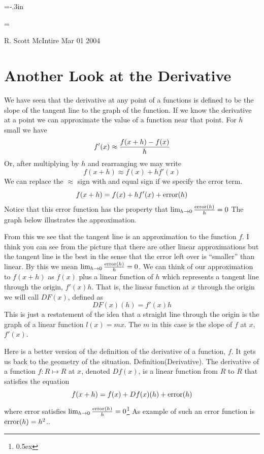 


\vsize=9.5in
\voffset=-.3in


\parindent=0pt
\parskip=\baselineskip

{R. Scott McIntire} {Mar 01 2004}

\section{Another Look at the Derivative}
We have seen that the derivative at any point of a functions is defined 
to be the slope of the 
tangent line to the graph of the function. If we know the derivative at 
a point we can approximate the value of a function near that point.
For $h$ small we have
$$
f'(x) \approx {f(x+h) - f(x) \over h }
$$
Or, after multiplying by $h$ and rearranging we may write
$$
f(x+h) \approx f(x) + h f'(x)
$$
We can replace the $\approx$ sign with and equal sign if we specify 
the error term. 
$$
f(x+h) = f(x) + h f'(x) + {\rm error\/}(h)
$$
Notice that this error function has the property that 
$\lim_{h \rightarrow 0} {{\rm error\/}(h) \over h } = 0$ 
The graph below illustrates the approximation. 

From this we see that the tangent line is an approximation to the function $f$.
I think you can see from the picture that there are other linear approximations 
but the tangent line is the best in the sense that the error left over is 
``smaller'' than linear. By this we mean 
$\lim_{h \rightarrow 0} {{\rm error\/}(h) \over h} = 0$. 
We can think of our approximation to $f(x+h)$ as $f(x)$ plus a linear function 
of $h$ which represents a tangent line through the origin, $f'(x) h$.
That is, the linear function at $x$ through the origin we will call $DF(x)$, 
defined as
$$
DF(x)(h) = f'(x) h
$$ 
This is just a restatement of the idea that a straight line through the 
origin is the graph of a linear function $l(x) = m x$. The $m$ in this 
case is the slope of $f$ at $x$, $f'(x)$.

Here is a better version of the definition of the derivative of a function, $f$.
It gets us back to the geometry of the situation. 
\proclaim Definition(Derivative). The derivative of a function $f:R \mapsto R$ 
at $x$, denoted $Df(x)$, is a linear function from $R$ to $R$ 
that satisfies the equation
$$
f(x+h) = f(x) + Df(x)(h) + {\rm error\/}(h)
$$
where error satisfies 
$\lim_{h \rightarrow 0} {{\rm error\/}(h) \over h} = 0$\footnote{\kern 0.5pt \raise 0.5ex \hbox{\dag}}
{As example of such an error function is ${\rm error\/}(h) = h^2$.}.

